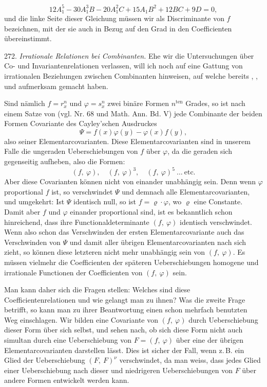 
\[
12A_1^5-30A_1^3B-20A_1^2C+15A_1B^2+12BC+9D=0,
\]
und die linke Seite dieser Gleichung müssen wir als Discriminante
von $f$ bezeichnen, mit der sie auch in Bezug auf den Grad in den
Coefficienten übereinstimmt.

272. \textit{Irrationale Relationen bei Combinanten.} Ehe wir die Untersuchungen
 über Co- und Invariantenrelationen verlassen, will ich
noch auf eine Gattung von irrationalen Beziehungen zwischen Combinanten
 hinweisen, auf welche bereits , , 
und  aufmerksam gemacht haben.

Sind nämlich $f=r_x^n$ und $\varphi=s_x^n$ zwei binäre Formen $n^{\mathrm{ten}}$ Grades,
so ist nach einem Satze von  (vgl. Nr. 68 und Math. Ann.
Bd. V) jede Combinante der beiden Formen Covariante des Cayley'schen
Ausdruckes
\[
\varPsi=f(x)\varphi(y)-\varphi(x)f(y),
\]
also seiner Elementarcovarianten. Diese Elementarcovarianten sind
in unserem Falle die ungeraden Ueberschiebungen von $f$ über $\varphi$, da
die geraden sich gegenseitig aufheben, also die Formen:
\[
(f,\ \varphi),\quad (f,\ \varphi)^3,\quad (f,\ \varphi)^5\ \ldots\ \text{etc.}
\]
Aber diese Covarianten können nicht von einander unabhängig sein.
Denn wenn $\varphi$ proportional $f$ ist, so verschwindet $\varPsi$ und demnach alle
Elementarcovarianten, und umgekehrt: Ist $\varPsi$ identisch null, so ist
$f=\varrho\cdot\varphi$, wo $\varrho$ eine Constante. Damit aber $f$ und $\varphi$ einander proportional
 sind, ist es bekanntlich schon hinreichend, dass ihre Functionaldeterminante
 $(f,\ \varphi)$ identisch verschwindet. Wenn also schon das
Verschwinden der ersten Elementarcovariante auch das Verschwinden
von $\varPsi$ und damit aller übrigen Elementarcovarianten nach sich zieht,
so können diese letzteren nicht mehr unabhängig sein von $(f,\ \varphi)$.
Es müssen vielmehr die Coefficienten der späteren Ueberschiebungen
homogene und irrationale Functionen der Coefficienten von $(f,\ \varphi)$ sein.

Man kann daher sich die Fragen stellen: Welches sind diese
Coefficientenrelationen und wie gelangt man zu ihnen? Was die zweite
Frage betrifft, so kann man zu ihrer Beantwortung einen schon mehrfach
 benutzten Weg einschlagen. Wir bilden eine Covariante von
$(f,\ \varphi)$ durch Ueberschiebung dieser Form über sich selbst, und sehen
nach, ob sich diese Form nicht auch simultan durch eine Ueberschiebung
 von $F=(f,\ \varphi)$ über eine der übrigen Elementarcovarianten
darstellen lässt. Dies ist sicher der Fall, wenn z.\,B. ein Glied der
Ueberschiebung $(F,\ F)^\nu$ verschwindet, da man weiss, dass jedes Glied
einer Ueberschiebung nach dieser und niedrigeren Ueberschiebungen
von $F$ über andere Formen entwickelt werden kann.


